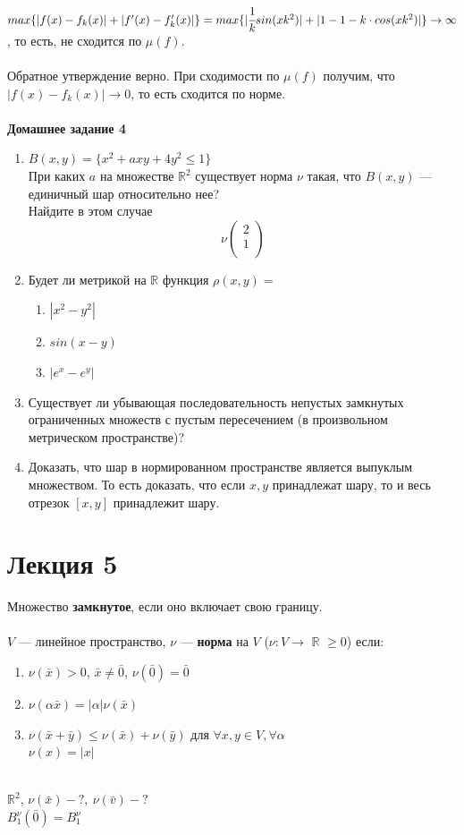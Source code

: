 \documentclass[12pt]{article}
\theoremstyle{definition}
\numberwithin{equation}{section}
\begin{document}
	$max \{|f(x)-f_k(x)|+|f'(x)-f_k'(x)|\} = max \{|\cfrac{1}{k}sin(xk^2)|+|1-1-k\cdot cos(xk^2)|\} \to \infty$, то есть, не сходится по $\mu(f)$.\\ \\
	Обратное утверждение верно. При сходимости по $\mu(f)$ получим, что $|f(x)-f_k(x)|\to 0$, то есть сходится по норме.\\ \\
	\noindent \textbf{Домашнее задание 4}\begin{enumerate}
		\item
		$B(x, y) = \{x^2+axy+4y^2 \leqslant 1\}$\\
		При каких $a$ на множестве $\mathbb{R}^2$ существует норма $\nu$ такая, что $B(x, y)$ --- единичный шар относительно нее? \\Найдите в этом случае
		\[\nu \begin{pmatrix}
		2 \\
		1\\
		\end{pmatrix}\]
		\item
		Будет ли метрикой на $\mathbb{R}$ функция $\rho(x, y) =$\begin{enumerate}
			\item $|x^2-y^2|$
			\item $sin(x-y)$
			\item $|e^x-e^y|$
		\end{enumerate}
		\item
		Существует ли убывающая последовательность непустых замкнутых ограниченных множеств с пустым пересечением (в произвольном метрическом пространстве)?
		\item
		Доказать, что шар в нормированном пространстве является выпуклым множеством. То есть доказать, что если $x, y$ принадлежат шару, то и весь отрезок $[x, y]$ принадлежит шару.\end{enumerate}
	\section *{Лекция 5}
	\noindent Множество \textbf{замкнутое}, если оно включает свою границу.\\ \\
	$V$ --- линейное пространство, $\nu$ --- \textbf{норма} на $V$ ($\nu : V \to$ $\mathbb{R}$ $\geqslant 0$) если:\begin{enumerate}
		\item $\nu(\bar x) > 0$, $\bar x \neq \bar 0$, $\nu(\bar 0) = \bar 0$
		\item $\nu(\alpha \bar x) = |\alpha|\nu(\bar x)$
		\item $\nu(\bar x + \bar y) \leq \nu(\bar x) + \nu(\bar y)$ для $\forall x, y \in V, \forall \alpha$\\
		$\nu (x) = |x|$\end{enumerate}
	~\\
	$\mathbb{R}^2$, $\nu(\bar x) - ?,~ \nu(\bar v ) - ?$\\
	$B_1^{\nu}(\bar 0) = B_1^{\nu}$
	
\end{document}
